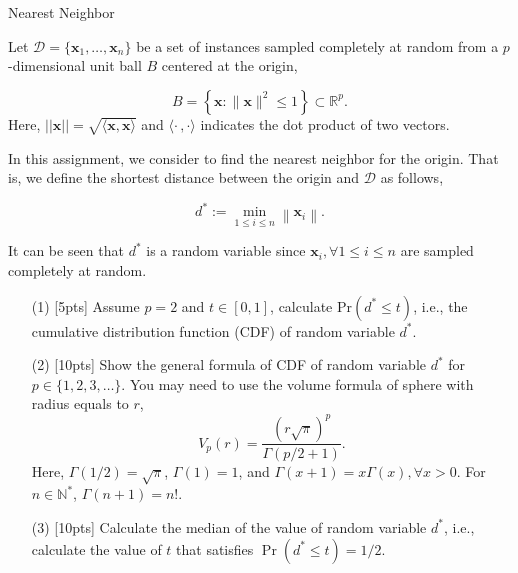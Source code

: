 \documentclass[11pt, a4paper, UTF8]{ctexart}
\begin{document}
\begin{problem}[ML problem 3]
[25pts] {Nearest Neighbor}
	
Let $\mathcal{D} = \{\mathbf{x}_1, \dots, \mathbf{x}_n\}$ be a set of instances sampled completely at random from a $p$-dimensional unit ball $B$ centered at the origin,

\begin{equation}
B=\left\{\mathbf{x} :\|\mathbf{x}\|^{2} \leq 1\right\} \subset \mathbb{R}^{p}.
\end{equation}
Here, $||\mathbf{x}|| = \sqrt{\langle \mathbf{x}, \mathbf{x}\rangle}$ and $\langle \cdot \,, \cdot \rangle$ indicates the dot product of two vectors.

In this assignment, we consider to find the nearest neighbor for the origin. That is, we define the shortest distance between the origin and $\mathcal{D}$ as follows,

\begin{equation}
d^{*} :=\min _{1 \leq i \leq n}\left\|\mathbf{x}_{i}\right\|.
\end{equation}

It can be seen that $d^*$ is a random variable since $\mathbf{x}_i, \forall 1 \leq i \leq n$ are sampled completely at random.	

\begin{enumerate}
	\item [(1)] [5pts] Assume $ p = 2 $ and $ t \in [0, 1]$, calculate Pr$(d^* \leq t)$, i.e., the cumulative distribution function (CDF) of random variable $d^*$.
	\item [(2)] [10pts] Show the general formula of CDF of random variable $d^*$ for $p \in \{1, 2, 3, \dots \}$. You may need to use the volume formula of sphere with radius equals to $r$,
	\begin{equation}
	V_{p}(r)=\frac{(r \sqrt{\pi})^{p}}{\Gamma(p / 2+1)}.
	\end{equation}
	Here, $\Gamma(1 / 2)=\sqrt{\pi}$, $\Gamma(1)=1$, and $\Gamma(x+1)=x \Gamma(x), \forall x > 0$. For $n \in \mathbb{N}^*$, $\Gamma(n+1)=n!$.
	\item [(3)] [10pts] Calculate the median of the value of random variable $d^*$, i.e., calculate the value of $t$ that satisfies $\operatorname{Pr}\left(d^{*} \leq t\right)=1 / 2$.
\end{enumerate}
	
\end{problem}

\begin{solution}

\end{solution}
\begin{remark}

	
\end{remark}
\end{document}
